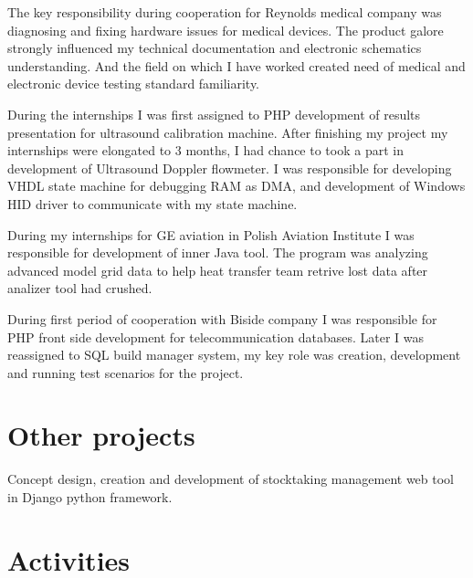 \documentclass[8pt,a4paper]{moderncv}
\begin{document}
\vspace{4mm}
\cvline{}{}
The key responsibility during cooperation for Reynolds medical company was diagnosing and fixing hardware issues for medical devices.
The product galore strongly influenced my technical documentation and electronic schematics understanding. And the field on which
I have worked created need of medical and electronic device testing standard familiarity.
\cvline{}{}

\vspace{4mm}
\cvline{}{}
During the internships I was first assigned to PHP development of results presentation for ultrasound calibration machine.
After finishing my project my internships were elongated to 3 months, I had chance to took a part in development of Ultrasound
Doppler flowmeter. I was responsible for developing VHDL state machine for debugging RAM as DMA, and development of Windows HID driver
to communicate with my state machine.
\cvline{}{}

\vspace{4mm}
\cvline{}{}
During my internships for GE aviation in Polish Aviation Institute I was responsible for development of inner Java tool.
The program was analyzing advanced model grid data to help heat transfer team retrive lost data after analizer tool had crushed.
\cvline{}{}

\vspace{4mm}
\cvline{}{}
During first period of cooperation with Biside company I was responsible for PHP front side development for telecommunication databases.
Later I was reassigned to SQL build manager system, my key role was creation, development and running test scenarios for the project.
\cvline{}{}

\section{Other projects}
\vspace{4mm}
\cvline{}{}
Concept design, creation and development of stocktaking management web tool in Django python framework.
\cvline{}{}

\section{Activities}
\vspace{4mm}
\end{document}
